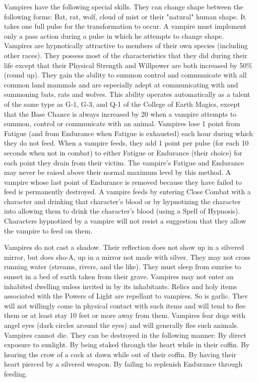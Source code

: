 \begin{multicols}{2}
\begin{description}
Vampires have the following special skills. They can change shape
between the following forms: Bat, rat, wolf, cloud of mist or their
"natural" human shape. It takes one full pulse for the transformation
to occur. A vampire must implement only a pass action during a pulse
in which he attempts to change shape. Vampires are hypnotically
attractive to members of their own species (including other races).
They possess most of the characteristics that they did during their
life except that their Physical Strength and Willpower are both
increased by 50\% (round up). They gain the ability to summon control
and communicate with all common land mammals and are especially adept
at communicating with and summoning bats, rats and wolves. This
ability operates automatically as a talent of the same type as G-1,
G-3, and Q-1 of the College of Earth Magics, except that the Base
Chance is always increased by 20 when a vampire attempts to summon,
control or communicate with an animal.  Vampires lose 1 point from
Fatigue (and from Endurance when Fatigue is exhausted) each hour
during which they do not feed.  When a vampire feeds, they add 1 point
per pulse (for each 10 seconds when not in combat) to either Fatigue
or Endurance (their choice) for each point they drain from their
victim. The vampire's Fatigue and Endurance may never be raised above
their normal maximum level by this method. A vampire whose last point
of Endurance is removed because they have failed to feed is
permanently destroyed. A vampire feeds by entering Close Combat with a
character and drinking that character's blood or by hypnotizing the
character into allowing them to drink the character's blood (using a
Spell of Hypnosis). Characters hypnotized by a vampire will not resist
a suggestion that they allow the vampire to feed on them.

Vampires do not cast a shadow. Their reflection does not show up in a
silvered mirror, but does sho-A, up in a mirror not made with
silver. They may not cross running water (streams, rivers, and the
like). They must sleep from sunrise to sunset in a bed of earth taken
from their grave. Vampires may not enter an inhabited dwelling unless
invited in by its inhabitants.  Relics and holy items associated with
the Powers of Light are repellant to vampires. So is garlic.  Thev
will not willingly come in physical contact with such items and will
tend to flee them or at least stay 10 feet or more away from them.
Vampires fear dogs with angel eyes (dark circles around the eyes) and
will generally flee such animals.  Vampires cannot die.  They can be
destroyed in the following manner:
 By direct exposure to sunlight.
 By being staked through the heart while in their coffin.
 By hearing the crow of a cock at dawn while out of their coffin.
 By having their heart pierced by a silvered weapon.
 By failing to replenish Endurance through feeding.



\end{description}
\end{multicols}

